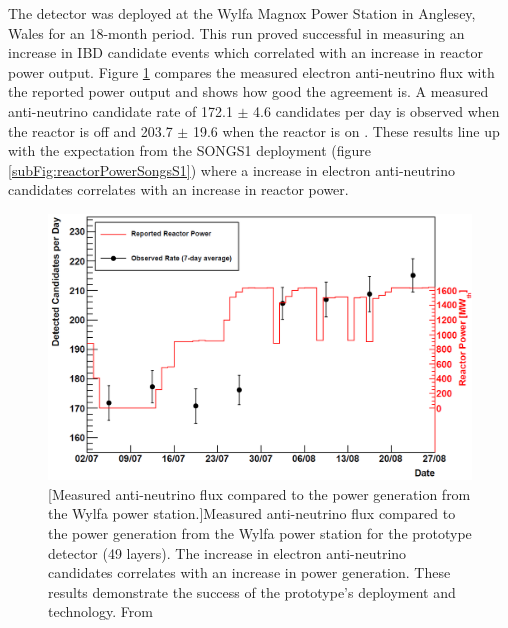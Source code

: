 The detector was deployed at the Wylfa Magnox Power Station in Anglesey, Wales for an 18-month period. This run proved successful in measuring an increase in IBD candidate events which correlated with an increase in reactor power output. Figure \ref{fig:prototypeMeasumentFlux} compares the measured electron anti-neutrino flux with the reported power output and shows how good the agreement is. A measured anti-neutrino candidate rate of 172.1 $\pm$ 4.6 candidates per day is observed when the reactor is off and 203.7 $\pm$ 19.6 when the reactor is on \cite{Carroll_2018}. These results line up with the expectation from the SONGS1 deployment (figure \ref{subFig:reactorPowerSongsS1}) where a increase in electron anti-neutrino candidates correlates with an increase in reactor power. %
\begin{figure}[!h]
 \centering
 \includegraphics[width=0.7\linewidth]{Chapter2/Figs/Raster/prototypeMeasureOnFig.png} 
 [Measured anti-neutrino flux compared to the power generation from the Wylfa power station.]{Measured anti-neutrino flux compared to the power generation from the Wylfa power station for the prototype detector (49 layers). The increase in electron anti-neutrino candidates correlates with an increase in power generation. These results demonstrate the success of the prototype's deployment and technology. From \cite{Carroll_2018}} %
 \label{fig:prototypeMeasumentFlux}
\end{figure}

